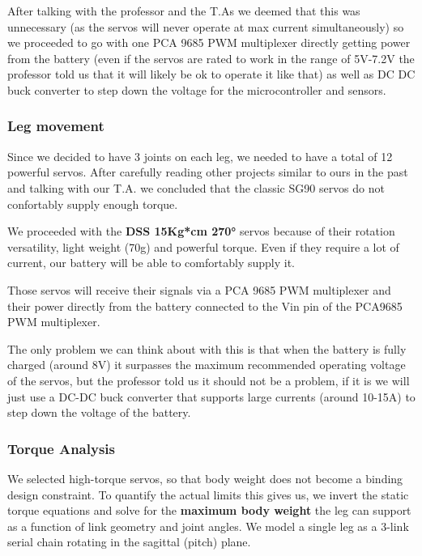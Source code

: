 \documentclass{article}
\begin{document}
\vspace{0.5cm}
After talking with the professor and the T.As we deemed that this was unnecessary (as the servos will never operate at max current simultaneously) so we proceeded to go with one PCA 9685 PWM multiplexer directly getting power from the battery (even if the servos are rated to work in the range of 5V-7.2V the professor told us that it will likely be ok to operate it like that) as well as DC DC buck converter to step down the voltage for the microcontroller and sensors.

\subsubsection{Leg movement}
Since we decided to have 3 joints on each leg, we needed to have a total of 12 powerful servos. After carefully reading other projects similar to ours in the past and talking with our T.A. we concluded that the classic SG90 servos do not confortably supply enough torque.

\vspace{0.5cm}
We proceeded with the \textbf{DSS 15Kg*cm 270°} servos because of their rotation versatility, light weight (70g) and powerful torque. Even if they require a lot of current, our battery will be able to comfortably supply it.

\vspace{0.5cm}

Those servos will receive their signals via a PCA 9685 PWM multiplexer and their power directly from the battery connected to the Vin pin of the PCA9685 PWM multiplexer.

\vspace{0.5cm}
The only problem we can think about with this is that when the battery is fully charged (around 8V) it surpasses the maximum recommended operating voltage of the servos, but the professor told us it should not be a problem, if it is we will just use a DC-DC buck converter that supports large currents (around 10-15A) to step down the voltage of the battery.

\subsubsection{Torque Analysis}

We selected high-torque servos, so that body weight does not become a binding design constraint.
To quantify the actual limits this gives us, we invert the static torque equations and solve for the \textbf{maximum body weight} the leg can support as a function of link geometry and joint angles.
We model a single leg as a 3-link serial chain rotating in the sagittal (pitch) plane.
\end{document}
